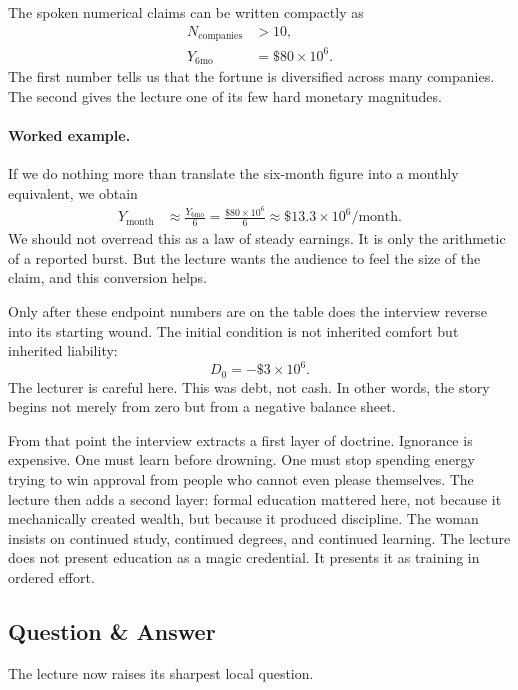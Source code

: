 The spoken numerical claims can be written compactly as
\begin{align}
N_{\text{companies}} &> 10,\\
Y_{6\text{mo}} &= \$80 \times 10^6.
\end{align}
The first number tells us that the fortune is diversified across many companies. The second gives the lecture one of its few hard monetary magnitudes.

\paragraph{Worked example.}
If we do nothing more than translate the six-month figure into a monthly equivalent, we obtain
\begin{align}
Y_{\text{month}} &\approx \frac{Y_{6\text{mo}}}{6}
= \frac{\$80 \times 10^6}{6}
\approx \$13.3 \times 10^6/\text{month}.
\end{align}
We should not overread this as a law of steady earnings. It is only the arithmetic of a reported burst. But the lecture wants the audience to feel the size of the claim, and this conversion helps.

Only after these endpoint numbers are on the table does the interview reverse into its starting wound. The initial condition is not inherited comfort but inherited liability:
\begin{equation}
D_0 = -\$3 \times 10^6.
\end{equation}
The lecturer is careful here. This was debt, not cash. In other words, the story begins not merely from zero but from a negative balance sheet.

From that point the interview extracts a first layer of doctrine. Ignorance is expensive. One must learn before drowning. One must stop spending energy trying to win approval from people who cannot even please themselves. The lecture then adds a second layer: formal education mattered here, not because it mechanically created wealth, but because it produced discipline. The woman insists on continued study, continued degrees, and continued learning. The lecture does not present education as a magic credential. It presents it as training in ordered effort.

\subsection{Question \& Answer}

The lecture now raises its sharpest local question.

